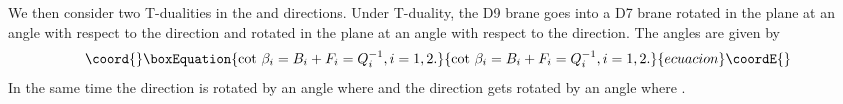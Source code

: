 \documentclass[a4paper,12pt]{article}
\begin{document}
We then consider two T-dualities
in the \coordHE{} and \coordHE{} directions. Under T-duality, the D9 brane goes 
into a D7 brane rotated in the \coordHE{} plane at an angle
\coordHE{} with respect to the \coordHE{} direction and rotated in the 
\coordHE{} plane at an angle \coordHE{} with respect to the
\coordHE{} direction. The angles are given by
\begin{equation}\coord{}\boxEquation{
\mbox{cot}~\beta_i = B_i + F_i = Q_i^{-1}, i = 1, 2.
}{
\mbox{cot}~\beta_i = B_i + F_i = Q_i^{-1}, i = 1, 2.
}{ecuacion}\coordE{}\end{equation}
In the same time the direction \coordHE{} is rotated by an angle
\coordHE{} where \coordHE{} 
and the direction \coordHE{} gets rotated by an angle \coordHE{}
where \coordHE{}. 
\end{document}
